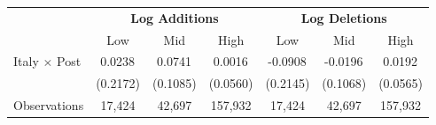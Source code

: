 \begin{tabular}{l|ccc|ccc}
\hline \hline
 & \multicolumn{3}{c|}{\textbf{Log Additions}} & \multicolumn{3}{c}{\textbf{Log Deletions}} \\
 & Low & Mid & High & Low & Mid & High \\
\hline
Italy $\times$ Post & 0.0238$^{}$ & 0.0741$^{}$ & 0.0016$^{}$ & -0.0908$^{}$ & -0.0196$^{}$ & 0.0192$^{}$ \\
 & (0.2172) & (0.1085) & (0.0560) & (0.2145) & (0.1068) & (0.0565) \\
\hline
Observations & 17,424 & 42,697 & 157,932 & 17,424 & 42,697 & 157,932 \\
\hline \hline
\end{tabular}
